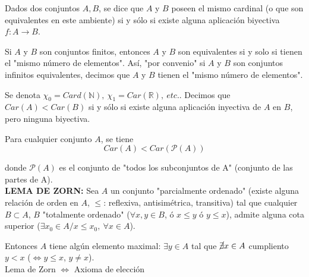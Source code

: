 \documentclass{article}
\begin{document}
\begin{enumerate}
Dados dos conjuntos $A,B$, se dice que $A$ y $B$ poseen el mismo cardinal (o que son equivalentes en este ambiente) si y sólo si existe alguna aplicación biyectiva $f:A\rightarrow B$. 

Si $A$ y $B$ son conjuntos finitos, entonces $A$ y $B$ son equivalentes si y solo si tienen el "mismo número de elementos". Así, "por convenio" si $A$ y $B$ son conjuntos infinitos equivalentes, decimos que $A$ y $B$ tienen el "mismo número de elementos".

Se denota $\chi_0=Card(\mathbb{N}),\:\chi_1=Car(\mathbb{R}),\:etc.$. Decimos que $Car(A)<Car(B)$ si y sólo si existe alguna aplicación inyectiva de $A$ en $B$, pero ninguna biyectiva. 

Para cualquier conjunto $A$, se tiene
\begin{equation*}
Car(A)<Car(\mathcal{P}(A))
\end{equation*}

donde $\mathcal{P}(A)$ es el conjunto de "todos los subconjuntos de A" (conjunto de las partes de A).\\

\textbf{LEMA DE ZORN:} Sea $A$ un conjunto "parcialmente ordenado" (existe alguna relación de orden en $A$, $\leq$: reflexiva, antisimétrica, transitiva) tal que cualquier $B\subset A$, $B$ "totalmente ordenado" ($\forall x,y\in B$, ó $x\leq y$ ó $y\leq x$), admite alguna cota superior ($\exists x_0\in A/x\leq x_0,\:\forall x\in A$). 

Entonces $A$ tiene algún elemento maximal: $\exists y\in A$ tal que $\cancel{\exists} x\in A$ cumpliento $y<x$ ($\Leftrightarrow y\leq x$, $y\neq x$).\\

Lema de Zorn $\Leftrightarrow$ Axioma de elección
\end{enumerate}
\end{document}
